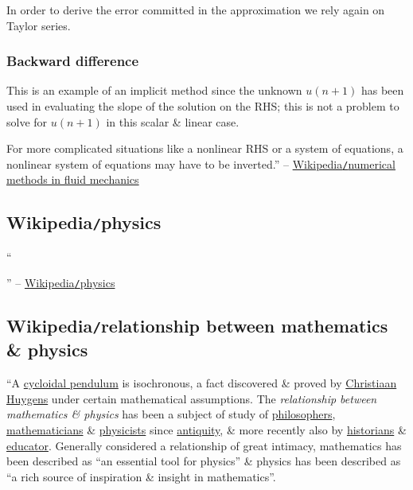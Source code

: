 \documentclass{article}
\begin{document}
In order to derive the error committed in the approximation we rely again on Taylor series.

\subsubsection{Backward difference}
This is an example of an implicit method since the unknown $u(n + 1)$ has been used in evaluating the slope of the solution on the RHS; this is not a problem to solve for $u(n + 1)$ in this scalar \& linear case.

For more complicated situations like a nonlinear RHS or a system of equations, a nonlinear system of equations may have to be inverted.'' -- \href{https://en.wikipedia.org/wiki/Numerical_methods_in_fluid_mechanics}{Wikipedia{\tt/}numerical methods in fluid mechanics}


\subsection{Wikipedia{\tt/}physics}
``

'' -- \href{https://en.wikipedia.org/wiki/Physics}{Wikipedia{\tt/}physics}


\subsection{Wikipedia{\tt/}relationship between mathematics \& physics}
``{\sf A \href{https://en.wikipedia.org/wiki/Cycloidal_pendulum}{cycloidal pendulum} is isochronous, a fact discovered \& proved by \href{https://en.wikipedia.org/wiki/Christiaan_Huygens}{\sc Christiaan Huygens} under certain mathematical assumptions.} The {\it relationship between mathematics \& physics} has been a subject of study of \href{https://en.wikipedia.org/wiki/Philosopher}{philosophers}, \href{https://en.wikipedia.org/wiki/Mathematician}{mathematicians} \& \href{https://en.wikipedia.org/wiki/Physicist}{physicists} since \href{https://en.wikipedia.org/wiki/Classical_antiquity}{antiquity}, \& more recently also by \href{https://en.wikipedia.org/wiki/Historian}{historians} \& \href{https://en.wikipedia.org/wiki/Educator}{educator}. Generally considered a relationship of great intimacy, mathematics has been described as ``an essential tool for physics'' \& physics has been described as ``a rich source of inspiration \& insight in mathematics''.
\end{document}
